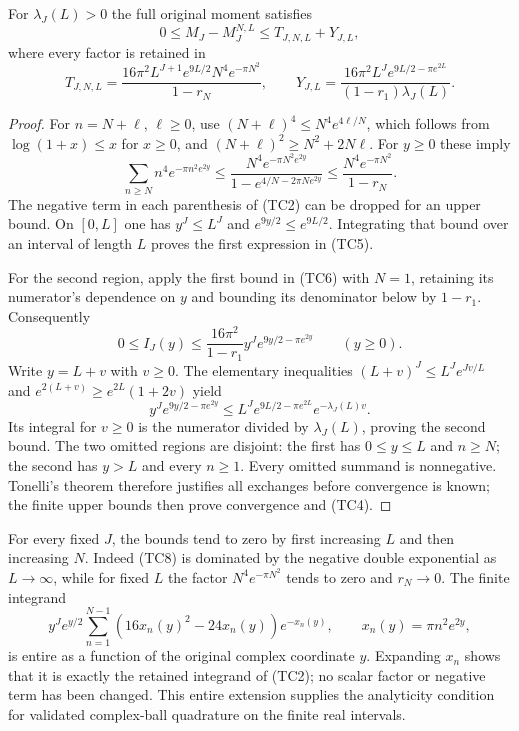 \begin{theorem}
For $\lambda_J(L)>0$ the full original moment satisfies
\[
0\le M_J-M_J^{N,L}\le T_{J,N,L}+Y_{J,L},
\tag{TC4}
\]
where every factor is retained in
\[
T_{J,N,L}
=\frac{16\pi^2L^{J+1}e^{9L/2}N^4e^{-\pi N^2}}{1-r_N},
\qquad
Y_{J,L}
=\frac{16\pi^2L^Je^{9L/2-\pi e^{2L}}}
{(1-r_1)\lambda_J(L)}.
\tag{TC5}
\]
\end{theorem}
\begin{proof}
For $n=N+\ell$, $\ell\ge0$, use
$(N+\ell)^4\le N^4e^{4\ell/N}$, which follows from
$\log(1+x)\le x$ for $x\ge0$, and
$(N+\ell)^2\ge N^2+2N\ell$. For $y\ge0$ these imply
\[
\sum_{n\ge N}n^4e^{-\pi n^2e^{2y}}
\le
\frac{N^4e^{-\pi N^2e^{2y}}}
{1-e^{4/N-2\pi Ne^{2y}}}
\le\frac{N^4e^{-\pi N^2}}{1-r_N}.
\tag{TC6}
\]
The negative term in each parenthesis of (TC2) can be dropped for
an upper bound. On $[0,L]$ one has $y^J\le L^J$ and
$e^{9y/2}\le e^{9L/2}$. Integrating that bound over an interval
of length $L$ proves the first expression in (TC5).

For the second region, apply the first bound in (TC6) with $N=1$,
retaining its numerator's dependence on $y$ and bounding its
denominator below by $1-r_1$. Consequently
\[
0\le I_J(y)\le
\frac{16\pi^2}{1-r_1}y^Je^{9y/2-\pi e^{2y}}
\qquad(y\ge0).
\tag{TC7}
\]
Write $y=L+v$ with $v\ge0$. The elementary inequalities
$(L+v)^J\le L^Je^{Jv/L}$ and
$e^{2(L+v)}\ge e^{2L}(1+2v)$ yield
\[
y^Je^{9y/2-\pi e^{2y}}
\le L^Je^{9L/2-\pi e^{2L}}e^{-\lambda_J(L)v}.
\tag{TC8}
\]
Its integral for $v\ge0$ is the numerator divided by
$\lambda_J(L)$, proving the second bound.
The two omitted regions are disjoint: the first has $0\le y\le L$
and $n\ge N$; the second has $y>L$ and every $n\ge1$.
Every omitted summand is nonnegative. Tonelli's theorem therefore
justifies all exchanges before convergence is known; the finite
upper bounds then prove convergence and (TC4).
\end{proof}

For every fixed $J$, the bounds tend to zero by first increasing $L$
and then increasing $N$. Indeed (TC8) is dominated by the negative
double exponential as $L\to\infty$, while for fixed $L$ the factor
$N^4e^{-\pi N^2}$ tends to zero and $r_N\to0$.
The finite integrand
\[
y^J e^{y/2}\sum_{n=1}^{N-1}(16x_n(y)^2-24x_n(y))e^{-x_n(y)},
\qquad x_n(y)=\pi n^2e^{2y},
\tag{TC9}
\]
is entire as a function of the original complex coordinate $y$.
Expanding $x_n$ shows that it is exactly the retained integrand
of (TC2); no scalar factor or negative term has been changed.
This entire extension supplies the analyticity condition for
validated complex-ball quadrature on the finite real intervals.

